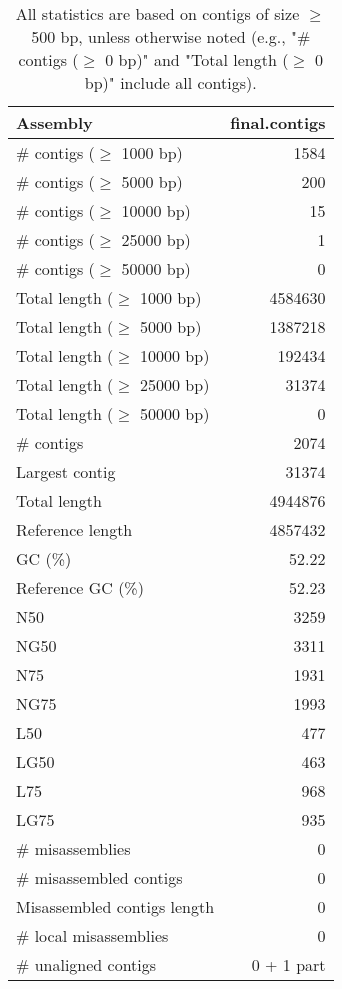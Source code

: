 \documentclass[12pt,a4paper]{article}
\begin{document}
\begin{table}[ht]
\begin{center}
\caption{All statistics are based on contigs of size $\geq$ 500 bp, unless otherwise noted (e.g., "\# contigs ($\geq$ 0 bp)" and "Total length ($\geq$ 0 bp)" include all contigs).}
\begin{tabular}{|l*{1}{|r}|}
\hline
Assembly & final.contigs \\ \hline
\# contigs ($\geq$ 1000 bp) & 1584 \\ \hline
\# contigs ($\geq$ 5000 bp) & 200 \\ \hline
\# contigs ($\geq$ 10000 bp) & 15 \\ \hline
\# contigs ($\geq$ 25000 bp) & 1 \\ \hline
\# contigs ($\geq$ 50000 bp) & 0 \\ \hline
Total length ($\geq$ 1000 bp) & 4584630 \\ \hline
Total length ($\geq$ 5000 bp) & 1387218 \\ \hline
Total length ($\geq$ 10000 bp) & 192434 \\ \hline
Total length ($\geq$ 25000 bp) & 31374 \\ \hline
Total length ($\geq$ 50000 bp) & 0 \\ \hline
\# contigs & 2074 \\ \hline
Largest contig & 31374 \\ \hline
Total length & 4944876 \\ \hline
Reference length & 4857432 \\ \hline
GC (\%) & 52.22 \\ \hline
Reference GC (\%) & 52.23 \\ \hline
N50 & 3259 \\ \hline
NG50 & 3311 \\ \hline
N75 & 1931 \\ \hline
NG75 & 1993 \\ \hline
L50 & 477 \\ \hline
LG50 & 463 \\ \hline
L75 & 968 \\ \hline
LG75 & 935 \\ \hline
\# misassemblies & 0 \\ \hline
\# misassembled contigs & 0 \\ \hline
Misassembled contigs length & 0 \\ \hline
\# local misassemblies & 0 \\ \hline
\# unaligned contigs & 0 + 1 part \\ \hline

\end{tabular}
\end{center}
\end{table}
\end{document}
